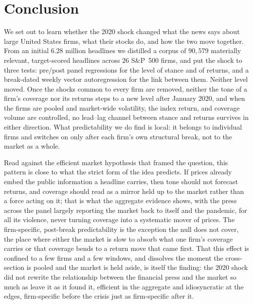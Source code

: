 \documentclass[conference]{IEEEtran}
\begin{document}
\section{Conclusion}
We set out to learn whether the 2020 shock changed what the news says about large
United States firms, what their stocks do, and how the two move together. From an
initial $6.28$ million headlines we distilled a corpus of $90{,}579$ materially
relevant, target-scored headlines across $26$ S\&P~500 firms, and put the shock to
three tests: pre/post panel regressions for the level of stance and of returns, and
a break-dated weekly vector autoregression for the link between them. Neither level
moved. Once the shocks common to every firm are removed, neither the tone of a
firm's coverage nor its returns steps to a new level after January 2020, and when
the firms are pooled and market-wide volatility, the index return, and coverage
volume are controlled, no lead--lag channel between stance and returns survives in
either direction. What predictability we do find is local: it belongs to individual
firms and switches on only after each firm's own structural break, not to the market
as a whole.

Read against the efficient market hypothesis that framed the question, this pattern
is close to what the strict form of the idea predicts. If prices already embed the
public information a headline carries, then tone should not forecast returns, and
coverage should read as a mirror held up to the market rather than a force acting on
it; that is what the aggregate evidence shows, with the press across the panel
largely reporting the market back to itself and the pandemic, for all its violence,
never turning coverage into a systematic mover of prices. The firm-specific,
post-break predictability is the exception the null does not cover, the place where
either the market is slow to absorb what one firm's coverage carries or that
coverage bends to a return move that came first. That this effect is confined to a
few firms and a few windows, and dissolves the moment the cross-section is pooled and
the market is held aside, is itself the finding: the 2020 shock did not rewrite the
relationship between the financial press and the market so much as leave it as it
found it, efficient in the aggregate and idiosyncratic at the edges, firm-specific
before the crisis just as firm-specific after it.




\end{document}
